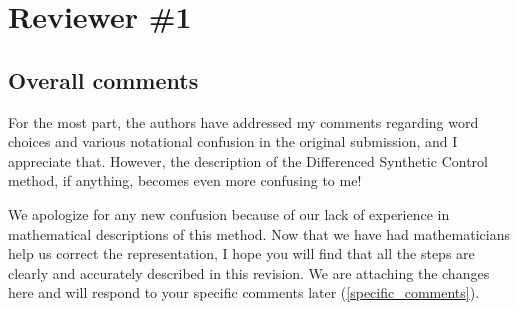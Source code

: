 \section{Reviewer \#1}\label{reviewer_1}

\subsection*{Overall comments}

\RC{} For the most part, the authors have addressed my comments regarding word choices and various notational confusion in the original submission, and I appreciate that. However, the description of the Differenced Synthetic Control method, if anything, becomes even more confusing to me!

\AR{} We apologize for any new confusion because of our lack of experience in mathematical descriptions of this method. Now that we have had mathematicians help us correct the representation, I hope you will find that all the steps are clearly and accurately described in this revision. We are attaching the changes here and will respond to your specific comments later (\ref{specific_comments}).

